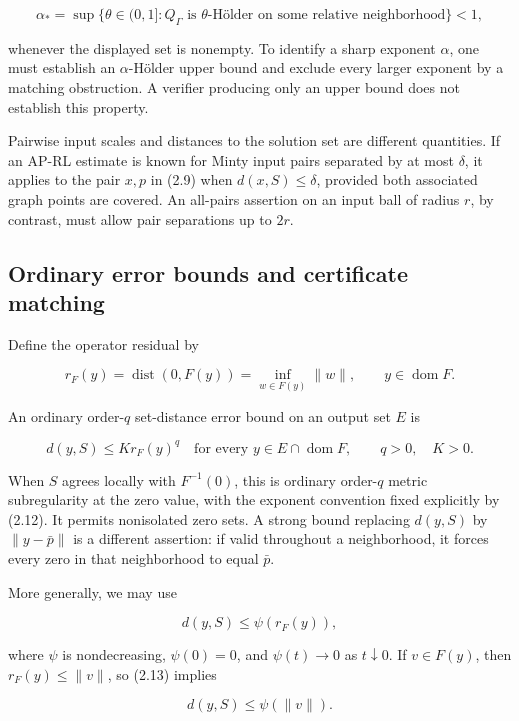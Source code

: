 \documentclass[11pt,a4paper]{article}
\theoremstyle{plain}
\theoremstyle{definition}
\theoremstyle{remark}
\begin{document}
\[
\alpha_*=
\sup\bigl\{\theta\in(0,1]:
Q_\Gamma\text{ is }\theta\text{-Hölder on some relative neighborhood}
\bigr\}<1,
\tag{2.10}
\]

whenever the displayed set is nonempty. To identify a sharp exponent
\(\alpha\), one must establish an \(\alpha\)-Hölder upper bound and
exclude every larger exponent by a matching obstruction. A verifier
producing only an upper bound does not establish this property.

Pairwise input scales and distances to the solution set are different
quantities. If an AP-RL estimate is known for Minty input pairs
separated by at most \(\delta\), it applies to the pair \(x,p\) in (2.9)
when \(d(x,S)\le\delta\), provided both associated graph points are
covered. An all-pairs assertion on an input ball of radius \(r\), by
contrast, must allow pair separations up to \(2r\).

\hypertarget{ordinary-error-bounds-and-certificate-matching}{%
\subsection{Ordinary error bounds and certificate
matching}\label{ordinary-error-bounds-and-certificate-matching}}

Define the operator residual by

\[
r_F(y)=\operatorname{dist}(0,F(y))
=\inf_{w\in F(y)}\|w\|,
\qquad y\in\operatorname{dom}F.
\tag{2.11}
\]

An ordinary order-\(q\) set-distance error bound on an output set \(E\)
is

\[
d(y,S)\le K r_F(y)^q
\quad\text{for every }y\in E\cap\operatorname{dom}F,
\qquad q>0,\quad K>0.
\tag{2.12}
\]

When \(S\) agrees locally with \(F^{-1}(0)\), this is ordinary
order-\(q\) metric subregularity at the zero value, with the exponent
convention fixed explicitly by (2.12). It permits nonisolated zero sets.
A strong bound replacing \(d(y,S)\) by \(\|y-\bar p\|\) is a different
assertion: if valid throughout a neighborhood, it forces every zero in
that neighborhood to equal \(\bar p\).

More generally, we may use

\[
d(y,S)\le\psi(r_F(y)),
\tag{2.13}
\]

where \(\psi\) is nondecreasing, \(\psi(0)=0\), and \(\psi(t)\to0\) as
\(t\downarrow0\). If \(v\in F(y)\), then \(r_F(y)\le\|v\|\), so (2.13)
implies

\[
d(y,S)\le\psi(\|v\|).
\tag{2.14}
\]
\end{document}
